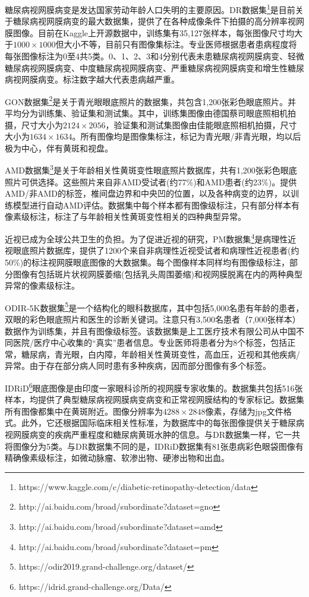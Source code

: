 糖尿病视网膜病变是发达国家劳动年龄人口失明的主要原因。DR数据集\footnote{https://www.kaggle.com/c/diabetic-retinopathy-detection/data}是目前关于糖尿病视网膜病变的最大数据集，提供了在各种成像条件下拍摄的高分辨率视网膜图像。目前在Kaggle上开源数据中，训练集有35,127张样本，每张图像尺寸均大于$1000\times 1000$但大小不等，目前只有图像集标注。专业医师根据患者患病程度将每张图像标注为0至4共5类。0、1、2、3和4分别代表未患糖尿病视网膜病变、轻微糖尿病视网膜病变、中度糖尿病视网膜病变、严重糖尿病视网膜病变和增生性糖尿病视网膜病变。标注数字越大代表患病越严重。

GON数据集\footnote{http://ai.baidu.com/broad/subordinate?dataset=gno}是关于青光眼眼底照片的数据集，共包含1,200张彩色眼底照片。并平均分为训练集、验证集和测试集。其中，训练集图像由德国蔡司眼底照相机拍摄，尺寸大小为$2124\times 2056$，验证集和测试集图像由佳能眼底照相机拍摄，尺寸大小为$1634\times 1634 $。所有图像均是图像集标注，标记为青光眼/非青光眼，均以后极为中心，伴有黄斑和视盘。

AMD数据集\footnote{http://ai.baidu.com/broad/subordinate?dataset=amd}是关于年龄相关性黄斑变性眼底照片数据库，共有1,200张彩色眼底照片可供选择。这些照片来自非AMD受试者(约77\%)和AMD患者(约23\%)。提供AMD/非AMD的标签，椎间盘边界和中央凹的位置，以及各种病变的边界，以训练模型进行自动AMD评估。数据集中每个样本都有图像级标注，只有部分样本有像素级标注，标注了与年龄相关性黄斑变性相关的四种典型异常。

近视已成为全球公共卫生的负担。为了促进近视的研究，PM数据集\footnote{http://ai.baidu.com/broad/subordinate?dataset=pm}是病理性近视眼底照片数据库，提供了1200个来自非病理性近视受试者和病理性近视患者(约50\%)的标注视网膜眼底图像的大数据集。每个图像样本同样均有图像级标注，部分图像有包括斑片状视网膜萎缩(包括乳头周围萎缩)和视网膜脱离在内的两种典型异常的像素级标注。

ODIR-5K数据集\footnote{https://odir2019.grand-challenge.org/dataset/}是一个结构化的眼科数据库，其中包括5,000名患有年龄的患者，双眼的彩色眼底照片和医生的诊断关键词。注意只有3,500名患者（7,000张样本）数据作为训练集，并且有图像级标签。该数据集是上工医疗技术有限公司从中国不同医院/医疗中心收集的“真实”患者信息。专业医师将患者分为8个标签，包括正常，糖尿病，青光眼，白内障，年龄相关性黄斑变性，高血压，近视和其他疾病/异常。由于存在部分病人同时患有多种疾病，因而部分图像有多个标签。

IDRiD\footnote{https://idrid.grand-challenge.org/Data/}眼底图像是由印度一家眼科诊所的视网膜专家收集的。数据集共包括516张样本，均提供了典型糖尿病视网膜病变病变和正常视网膜结构的专家标记。数据集所有图像都集中在黄斑附近。图像分辨率为$4288\times 2848$像素，存储为jpg文件格式。此外，它还根据国际临床相关性标准，为数据库中的每张图像提供关于糖尿病视网膜病变的疾病严重程度和糖尿病黄斑水肿的信息。与DR数据集一样，它一共将图像分为5类。与DR数据集不同的是，IDRiD数据集有81张患病彩色眼袋图像有精确像素级标注，如微动脉瘤、软渗出物、硬渗出物和出血。

